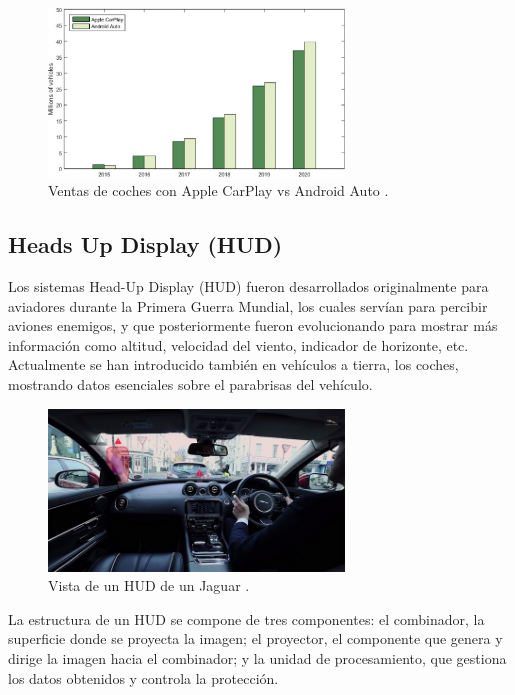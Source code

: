 \documentclass[12pt]{report} %
\begin{document}
\begin{figure}[H]
    \centering
    \includegraphics[width=0.7\textwidth]{integrationSolution.png}
	\caption{Ventas de coches con Apple CarPlay vs Android Auto \cite{mobileIntegration}.}
	\label{fig:imagen6}
\end{figure}

\subsection{Heads Up Display (HUD)}

Los sistemas Head-Up Display (HUD) fueron desarrollados originalmente para aviadores durante la Primera Guerra Mundial, los cuales servían para percibir aviones enemigos, y que posteriormente fueron evolucionando para mostrar más información como altitud, velocidad del viento, indicador de horizonte, etc. Actualmente se han introducido también en vehículos a tierra, los coches, mostrando datos esenciales sobre el parabrisas del vehículo.
\cite{hudPaper}

\begin{figure}[h]
    \centering
    \includegraphics[width=0.7\textwidth]{hud.png}
    \caption{Vista de un HUD de un Jaguar \cite{hudPaper}.}
    \label{fig:imagen7}
\end{figure}

La estructura de un HUD se compone de tres componentes: el combinador, la superficie donde se proyecta la imagen; el proyector, el componente que genera y dirige la imagen hacia el combinador; y la unidad de procesamiento, que gestiona los datos obtenidos y controla la protección.
\end{document}
